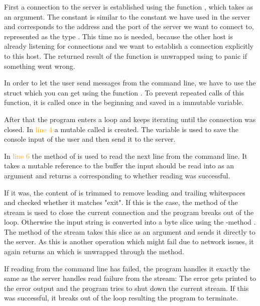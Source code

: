 First a connection to the server is established using the function , which takes
 as an argument. The constant  is similar to the constant we have used in the server and
corresponds to the address and the port of the server we want to connect to, represented as the type . This
time no  is needed, because the other host is already listening for connections and we want to
establish a connection explicitly to this host. The returned result of the function is unwrapped using  to
panic if something went wrong.

In order to let the user send messages from the command line, we have to use the struct  which you
can get using the function . To prevent repeated calls of this function, it is called once in the
beginning and saved in a immutable variable.

After that the program enters a loop and keeps iterating until the connection was closed. In \textcolor{orange}{line 4}
a mutable  called  is created. The variable is used to save the console input of the user and
then send it to the server.

In \textcolor{orange}{line 6} the method  of  is used to read the next
line from the command line. It takes a mutable reference to the buffer the input should be read into as an argument and
returns a  corresponding to whether reading was successful.

If it was, the content of  is trimmed to remove leading and trailing whitespaces and checked whether it
matches "exit". If this is the case, the  method of the stream is used to close the current connection
and the program breaks out of the loop. Otherwise the input string is converted into a byte slice using
the -method . The method  of the stream takes this slice as an argument and
sends it directly to the server. As this is another operation which might fail due to network issues, it again returns an
 which is unwrapped through the  method.

If reading from the command line has failed, the program handles it exactly the same as the server handles read failure
from the stream: The error gets printed to the error output and the program tries to shut down the current stream. If
this was successful, it breaks out of the loop resulting the program to terminate.

